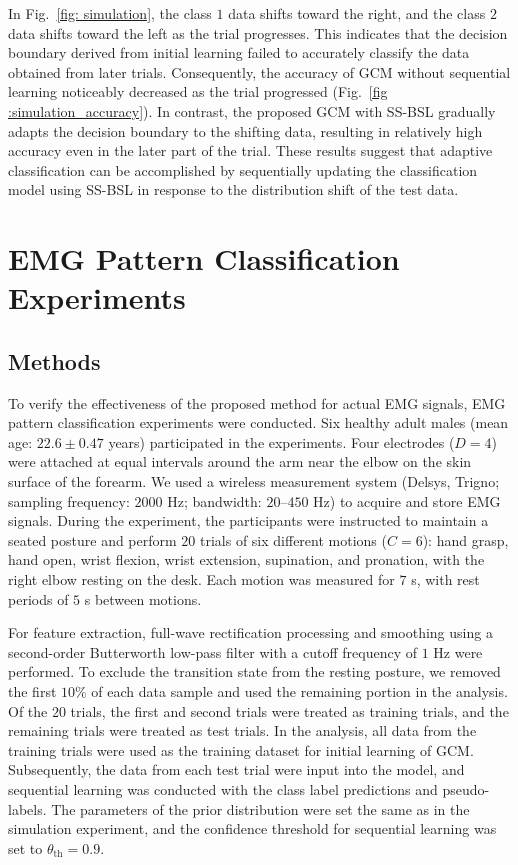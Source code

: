 \documentclass[letterpaper, 10 pt, conference]{ieeeconf}
\begin{document}
In Fig.~\ref{fig: simulation}, the class $1$ data shifts toward the right, and the class $2$ data shifts toward the left as the trial progresses.
This indicates that the decision boundary derived from initial learning failed to accurately classify the data obtained from later trials.
Consequently, the accuracy of GCM without sequential learning noticeably decreased as the trial progressed (Fig.~\ref{fig :simulation_accuracy}).
In contrast, the proposed GCM with SS-BSL gradually adapts the decision boundary to the shifting data, resulting in relatively high accuracy even in the later part of the trial.
These results suggest that adaptive classification can be accomplished by sequentially updating the classification model using SS-BSL in response to the distribution shift of the test data.


\section{EMG Pattern Classification Experiments}
\subsection{Methods}
To verify the effectiveness of the proposed method for actual EMG signals, EMG pattern classification experiments were conducted. 
Six healthy adult males (mean age: $22.6 \pm 0.47$ years) participated in the experiments.
Four electrodes ($D = 4$) were attached at equal intervals around the arm near the elbow on the skin surface of the forearm. 
We used a wireless measurement system (Delsys, Trigno; sampling frequency: $2000$ Hz; bandwidth: $20$--$450$ Hz) to acquire and store EMG signals.
During the experiment, the participants were instructed to maintain a seated posture and perform $20$ trials of six different motions ($C = 6$): hand grasp, hand open, wrist flexion, wrist extension, supination, and pronation, with the right elbow resting on the desk. 
Each motion was measured for $7$ s, with rest periods of $5$ s between motions.

For feature extraction, full-wave rectification processing and smoothing using a second-order Butterworth low-pass filter with a cutoff frequency of $1$ Hz were performed.
To exclude the transition state from the resting posture, we removed the first $10\%$ of each data sample and used the remaining portion in the analysis. 
Of the $20$ trials, the first and second trials were treated as training trials, and the remaining trials were treated as test trials. 
In the analysis, all data from the training trials were used as the training dataset for initial learning of GCM.
Subsequently, the data from each test trial were input into the model, and sequential learning was conducted with the class label predictions and pseudo-labels. 
The parameters of the prior distribution were set the same as in the simulation experiment, and the confidence threshold for sequential learning was set to $\theta_{\mathrm{th}} = 0.9$.
\end{document}
